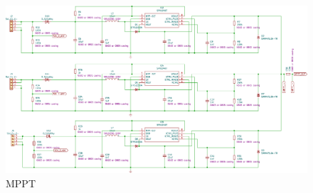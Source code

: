   \begin{figure}[h]
 	\centering
 	\includegraphics[width=0.99\columnwidth]{FrontMatter/pcb-MPPTv2.pdf}
 	\caption{\centering MPPT}
 	\label{fig:mpp 4lr}
 \end{figure}
 
